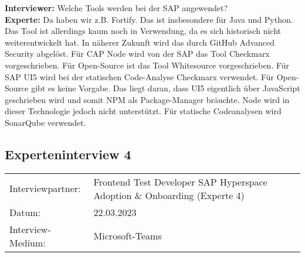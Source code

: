 \begin{linenumbers}
    \textbf{Interviewer:} Welche Tools werden bei der SAP angewendet?\\
    \textbf{Experte:} Da haben wir z.B. Fortify. Das ist insbesondere für Java und Python. Das Tool ist allerdings kaum noch in Verwendung, da es sich historisch nicht weiterentwickelt hat. In näherer Zukunft wird das durch GitHub Advanced Security abgelöst. Für CAP Node wird von der SAP das Tool Checkmarx vorgeschrieben. Für Open-Source ist das Tool Whitesource vorgeschrieben. Für SAP UI5 wird bei der statischen Code-Analyse Checkmarx verwendet. Für Open-Source gibt es keine Vorgabe. Das liegt daran, dass UI5 eigentlich über JavaScript geschrieben wird und somit NPM als Package-Manager bräuchte. Node wird in dieser Technologie jedoch nicht unterstützt. Für statische Codeanalysen wird SonarQube verwendet.
\end{linenumbers}

\newpage
\resetlinenumber
\subsection{Experteninterview 4}
	\begin{tabular}{ l l }
		Interviewpartner: & Frontend Test Developer SAP Hyperspace Adoption \& Onboarding (Experte 4)\\
		Datum: & 22.03.2023\\
		Interview-Medium: & Microsoft-Teams\\
\end{tabular}\\\\


